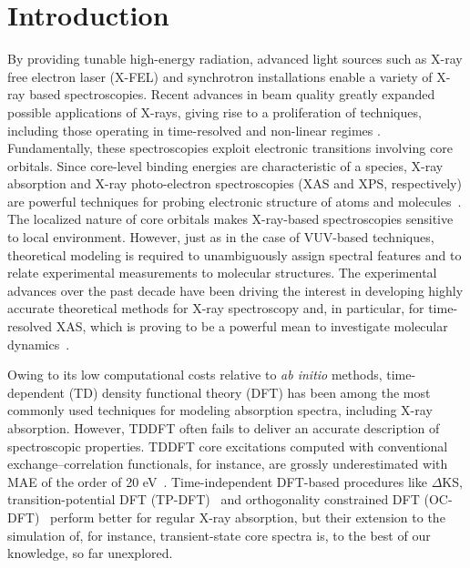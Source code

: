 \documentclass[journal=jctcce,manuscript=article]{achemso}
\begin{document}
\section{Introduction}

By providing tunable high-energy radiation, advanced light sources
such as X-ray free electron laser (X-FEL) and synchrotron installations enable a variety of X-ray based spectroscopies\cite{Lamberti:XRay:2016,Mobilio:XRay:2014,Bergmann:FEL:17}.
Recent advances in beam quality greatly expanded possible applications of X-rays, giving rise to a proliferation of techniques, including those operating in time-resolved and non-linear regimes \cite{Mobilio:XRay:2014,Lamberti:XRay:2016,Bergmann:FEL:17,Atto:Rev:17,Norman:ChemRev:18}.  
Fundamentally, these spectroscopies exploit electronic transitions involving core orbitals. 
Since core-level binding energies are characteristic of a species, X-ray absorption and X-ray photo-electron spectroscopies (XAS and XPS, respectively) are powerful techniques for probing electronic structure of atoms and molecules~\cite{Stohr1992}.
The localized nature of core orbitals makes X-ray-based spectroscopies sensitive to local environment.  
However, just as in the case of VUV-based techniques\cite{Ahmed:ARPC:16},
theoretical modeling is required to unambiguously assign spectral features and to relate experimental measurements to molecular structures. 
The experimental advances over the past decade have been driving the interest in developing highly accurate theoretical methods for X-ray spectroscopy and, in particular, for time-resolved XAS, which is proving to be a powerful mean to investigate molecular dynamics~\cite{Norman:ChemRev:18,naturecomm,Milne2014,kraus2018}.

Owing to its low computational costs relative to \textit{ab initio} methods, time-dependent (TD) density functional theory (DFT) has been among the most commonly used techniques for modeling absorption spectra, including X-ray absorption\cite{Besley:CoreDFTPersp:10}.
However, TDDFT often fails to deliver an accurate description of spectroscopic properties.
TDDFT core excitations computed with conventional
exchange--correlation functionals, for instance, are grossly underestimated with MAE of the order of 20 eV~\cite{Besley:CoreDFTPersp:10}. Time-independent DFT-based procedures like $\Delta$KS, transition-potential DFT (TP-DFT)~\cite{TPDFT} and
orthogonality constrained  DFT (OC-DFT)~\cite{evangelista2013,derricotte2015simulation}
perform better for regular X-ray absorption, but their extension to the simulation of, for instance, transient-state core spectra is, to the best of our knowledge, so far unexplored.
\end{document}
